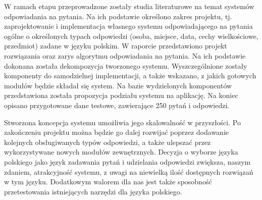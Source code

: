 W ramach etapu przeprowadzone zostały studia literaturowe na temat systemów odpowiadania na pytania. Na ich podstawie określono zakres projektu, tj. zaprojektowanie i implementacja własnego systemu odpowiadającego na pytania ogólne o określonych typach odpowiedzi (osoba, miejsce, data, cechy wielkościowe, przedmiot) zadane w języku polskim. W raporcie przedstawiono projekt rozwiązania oraz zarys algorytmu odpowiadania na pytania.  Na ich podstawie dokonana została dekompozycja tworzonego systemu. Wyszczególnione zostały komponenty do samodzielnej implementacji, a także wskazano, z jakich gotowych modułów będzie składał się system. Na bazie wydzielonych komponentów przedstawiona została propozycja podziału systemu na aplikację. Na koniec opisano przygotowane dane testowe, zawierające 250 pytań i odpowiedzi.


Stworzona koncepcja systemu umożliwia jego skalowalność w przyszłości. Po zakończeniu projektu można będzie go dalej rozwijać poprzez dodawanie kolejnych obsługiwanych typów odpowiedzi, a także ulepszać przez wykorzystywane nowych modułów zewnętrznych.  Decyzja o wyborze języka polskiego jako język zadawania pytań i udzielania odpowiedzi zwiększa, naszym zdaniem, atrakcyjność systemu, z uwagi na niewielką ilość dostępnych rozwiązań w tym języku. Dodatkowym walorem dla nas jest także sposobność przetestowania istniejących narzędzi dla języka polskiego.